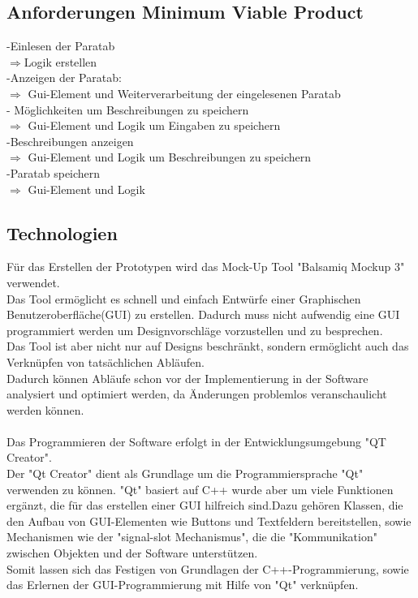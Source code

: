 \documentclass[12pt,a4paper]{article}
\begin{document}
\subsection{Anforderungen Minimum Viable Product}
-Einlesen der Paratab\\
 $\Rightarrow$Logik erstellen\\
-Anzeigen der Paratab:\\
 $\Rightarrow$ Gui-Element und Weiterverarbeitung der eingelesenen Paratab\\
- Möglichkeiten um Beschreibungen zu speichern \\
 $\Rightarrow$ Gui-Element und Logik um Eingaben zu speichern\\
-Beschreibungen anzeigen\\
 $\Rightarrow$ Gui-Element und Logik um Beschreibungen zu speichern\\
-Paratab speichern\\
$\Rightarrow$ Gui-Element und Logik 
\\


\subsection{Technologien}
Für das Erstellen der Prototypen wird das Mock-Up Tool "Balsamiq Mockup 3" verwendet.\\
Das Tool ermöglicht es schnell und einfach Entwürfe einer Graphischen Benutzeroberfläche(GUI) zu erstellen. Dadurch muss nicht aufwendig eine GUI programmiert werden um Designvorschläge vorzustellen und zu besprechen. \\
Das Tool ist aber nicht nur auf Designs beschränkt, sondern ermöglicht auch das Verknüpfen von tatsächlichen Abläufen.\\
Dadurch können Abläufe schon vor der Implementierung in der Software analysiert und optimiert werden, da Änderungen problemlos veranschaulicht werden können.
\\ \\
Das Programmieren der Software erfolgt in der Entwicklungsumgebung "QT Creator". \\
Der "Qt Creator" dient als Grundlage um die Programmiersprache "Qt" verwenden zu können. "Qt" basiert auf C++ wurde aber um viele Funktionen ergänzt, die für das erstellen einer GUI hilfreich sind.Dazu gehören Klassen, die den Aufbau von GUI-Elementen wie Buttons und Textfeldern bereitstellen, sowie Mechanismen wie der "signal-slot Mechanismus", die die "Kommunikation" zwischen Objekten und der Software unterstützen.\\
 Somit lassen sich das Festigen von Grundlagen der C++-Programmierung, sowie das Erlernen der GUI-Programmierung mit Hilfe von "Qt" verknüpfen.\\
\end{document}
